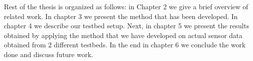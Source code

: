 Rest of the thesis is organized as follows: in Chapter 2 we give a brief overview of related work. In chapter 3 we present the method that has been developed. In chapter 4 we describe our testbed setup. Next, in chapter 5 we present the results obtained by applying the method that we have developed on actual sensor data obtained from 2 different testbeds. In the end in chapter 6 we conclude the work done and discuss future work.






\vspace{1\baselineskip}

\noindent

